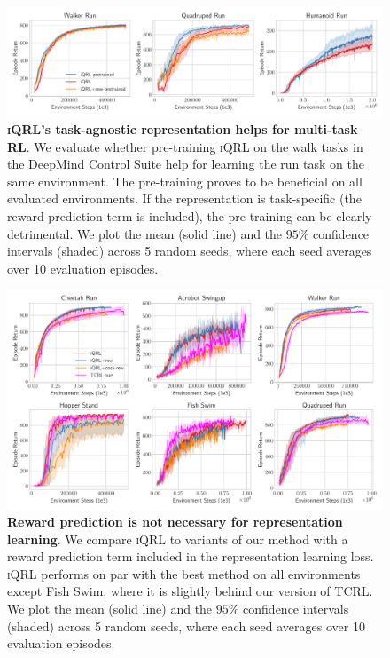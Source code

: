 \documentclass{article}
\theoremstyle{plain}
\theoremstyle{definition}
\theoremstyle{remark}
\newcommand{\our}{\textsc{iQRL}\xspace}
\begin{document}
\begin{figure}[ht]
	\vskip 0.2in
	\begin{center}
		\centerline{\includegraphics[width=\textwidth]{./figs/task-agnostic-ablation.pdf}}
		\caption{\textbf{\our's task-agnostic representation helps for multi-task RL}. We evaluate whether pre-training \our on the walk tasks in the DeepMind Control Suite help for learning the run task on the same environment. The pre-training proves to be beneficial on all evaluated environments. If the representation is task-specific (the reward prediction term is included), the pre-training can be clearly detrimental. We plot the mean (solid line) and the $95\%$ confidence intervals (shaded) across 5 random seeds, where each seed averages over 10 evaluation episodes.}
		\label{fig:multi-task-pretraining}
	\end{center}
	\vskip -0.2in
\end{figure}

\begin{figure}[ht]
\vskip 0.2in
\begin{center}
\centerline{\includegraphics[width=1.0\textwidth]{./figs/reward-ablation.pdf}}
\caption{\textbf{Reward prediction is not necessary for representation learning}. We compare \our to variants of our method with a reward prediction term included in the representation learning loss. \our performs on par with the best method on all environments except Fish Swim, where it is slightly behind our version of TCRL. We plot the mean (solid line) and the $95\%$ confidence intervals (shaded) across 5 random seeds, where each seed averages over 10 evaluation episodes.}
\label{fig:reward-ablation}
\end{center}
\vskip -0.2in
\end{figure}
\end{document}
